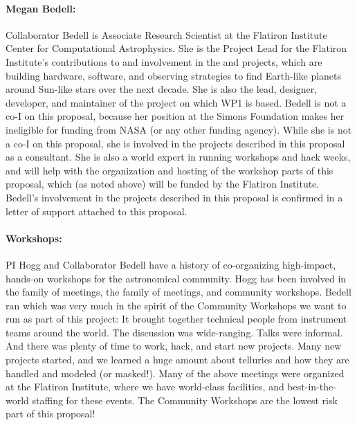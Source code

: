 \documentclass[12pt]{article}
\begin{document}
\paragraph{Megan Bedell:}
Collaborator Bedell is Associate Research Scientist at the Flatiron Institute Center for Computational Astrophysics.
She is the Project Lead for the Flatiron Institute's contributions to and involvement in the  and  projects, which are building hardware, software, and observing strategies to find Earth-like planets around Sun-like stars over the next decade.
She is also the lead, designer, developer, and maintainer of the  project \cite{Bedell2019} on which WP1 is based.
Bedell is not a co-I on this proposal, because her position at the Simons Foundation makes her ineligible for funding from NASA (or any other funding agency).
While she is not a co-I on this proposal, she is involved in the projects described in this proposal as a consultant.
She is also a world expert in running workshops and hack weeks, and will help with the organization and hosting of the workshop parts of this proposal, which (as noted above) will be funded by the Flatiron Institute.
Bedell's involvement in the projects described in this proposal is confirmed in a letter of support attached to this proposal.

\paragraph{Workshops:}
PI Hogg and Collaborator Bedell have a history of co-organizing high-impact, hands-on workshops for the astronomical community.
Hogg has been involved in the  family of meetings, the  family of meetings, and  community workshops.
Bedell ran  which was very much in the spirit of the Community Workshops we want to run as part of this project:
It brought together technical people from instrument teams around the world. The discussion was wide-ranging. Talks were informal. And there was plenty of time to work, hack, and start new projects.
Many new projects started, and we learned a huge amount about tellurics and how they are handled and modeled (or masked!).
Many of the above meetings were organized at the Flatiron Institute, where we have world-class facilities, and best-in-the-world staffing for these events.
The Community Workshops are the lowest risk part of this proposal!
\end{document}
